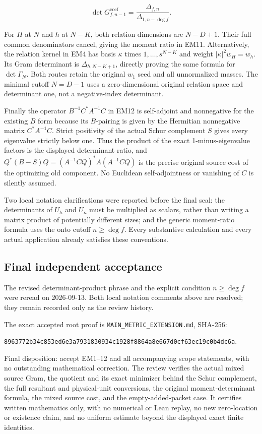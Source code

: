 \[\det G_{f,n-1}^{\mathrm{coef}}=\frac{\Delta_{f,n}}{\Delta_{1,n-\deg f}}.\]

For \(H\) at \(N\) and \(h\) at \(N-K\), both relation dimensions are \(N-D+1\).
Their full common denominators cancel, giving the moment ratio in EM11.
Alternatively, the relation kernel in EM4 has basis \(\kappa\) times
\(1,\ldots,s^{N-K}\) and weight \(|\kappa|^2w_H=w_h\). Its Gram determinant
is \(\Delta_{h,N-K+1}\), directly proving the same formula for \(\det\Gamma_N\).
Both routes retain the original \(w_1\) seed and all unnormalized masses.
The minimal cutoff \(N=D-1\) uses a zero-dimensional original relation
space and determinant one, not a negative-index determinant.

Finally the operator \(B^{-1}C^*A^{-1}C\) in EM12 is self-adjoint and
nonnegative for the existing \(B\) form because its \(B\)-pairing is given by
the Hermitian nonnegative matrix \(C^*A^{-1}C\). Strict positivity of
the actual Schur complement \(S\) gives every eigenvalue strictly below
one. Thus the product of the exact 1-minus-eigenvalue factors is the
displayed determinant ratio, and
\(Q^*(B-S)Q=(A^{-1}CQ)^*A(A^{-1}CQ)\) is the precise original source
cost of the optimizing old component. No Euclidean self-adjointness
or vanishing of \(C\) is silently assumed.

Two local notation clarifications were reported before the final seal:
the determinants of \(U_h\) and \(U_\kappa\) must be multiplied as scalars,
rather than writing a matrix product of potentially different sizes;
and the generic moment-ratio formula uses the onto cutoff \(n\ge\deg f\).
Every substantive calculation and every actual application already
satisfies these conventions.

\subsection*{Final independent acceptance}

The revised determinant-product phrase and the explicit condition
\(n\ge\deg f\) were reread on 2026-09-13. Both local notation comments above
are resolved; they remain recorded only as the review history.

The exact accepted root proof is \texttt{MAIN\_METRIC\_EXTENSION.md}, SHA-256:

\noindent\texttt{8963772b34c853ed6e3a7931830934c1928f8864a8e667d0cf63ec19c0b4dc6a}.

Final disposition: accept EM1--12 and all accompanying scope statements,
with no outstanding mathematical correction. The review verifies the
actual mixed source Gram, the quotient and its exact minimizer behind
the Schur complement, the full resultant and physical-unit conversions,
the original moment-determinant formula, the mixed source cost, and the
empty-added-packet case. It certifies written mathematics only, with
no numerical or Lean replay, no new zero-location or existence claim,
and no uniform estimate beyond the displayed exact finite identities.
